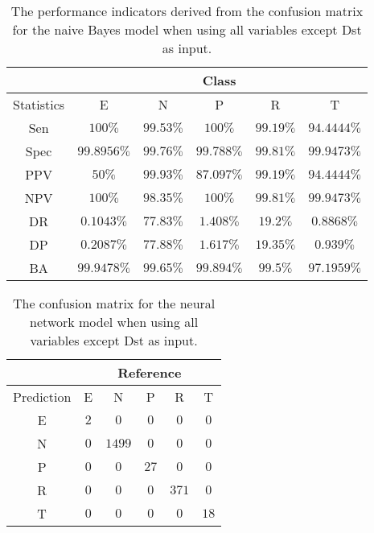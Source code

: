 \begin{table}[!ht]
	\centering
	\begin{tabular}{|c|c|c|c|c|c|}
		\hline
		 & \multicolumn{5}{c|}{Class} \\ \hline
		Statistics & E & N & P & R & T \\ \hline
		Sen & $100\%$ & $99.53\%$ & $100\%$ & $99.19\%$ & $94.4444\%$ \\ \hline
		Spec & $99.8956\%$ & $99.76\%$ & $99.788\%$ & $99.81\%$ & $99.9473\%$ \\ \hline
		PPV & $50\%$ & $99.93\%$ & $87.097\%$ & $99.19\%$ & $94.4444\%$ \\ \hline
		NPV & $100\%$ & $98.35\%$ & $100\%$ & $99.81\%$ & $99.9473\%$ \\ \hline
		DR & $0.1043\%$ & $77.83\%$ & $1.408\%$ & $19.2\%$ & $0.8868\%$ \\ \hline
		DP & $0.2087\%$ & $77.88\%$ & $1.617\%$ & $19.35\%$ & $0.939\%$ \\ \hline
		BA & $99.9478\%$ & $99.65\%$ & $99.894\%$ & $99.5\%$ & $97.1959\%$ \\ \hline
	\end{tabular}
	\caption{The performance indicators derived from the confusion matrix for the naive Bayes model when using all variables except Dst as input.}
	\label{tab:cs:reverse:noDst:nb}
\end{table}

\begin{table}[!ht]
	\centering
	\begin{tabular}{|c|c|c|c|c|c|}
		\hline
		 & \multicolumn{5}{|c|}{Reference} \\ \hline
		 Prediction & E & N & P & R & T \\ \hline
		 E & $2$ & $0$ & $0$ & $0$ & $0$ \\ \hline
		 N & $0$ & $1499$ & $0$ & $0$ & $0$ \\ \hline
		 P & $0$ & $0$ & $27$ & $0$ & $0$ \\ \hline
		 R & $0$ & $0$ & $0$ & $371$ & $0$ \\ \hline
		 T & $0$ & $0$ & $0$ & $0$ & $18$ \\ \hline
	\end{tabular}
	\caption{The confusion matrix for the neural network model when using all variables except Dst as input.}
	\label{tab:cm:noDst:nnet}
\end{table}

